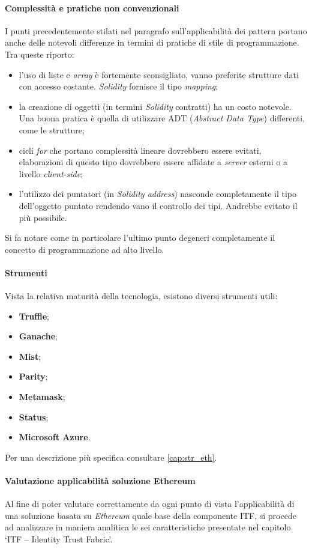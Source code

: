 \paragraph{Complessità e pratiche non convenzionali}
\label{cap:prestazioni}
I punti precedentemente stilati nel paragrafo sull’applicabilità dei pattern portano anche delle notevoli differenze in termini di pratiche di stile di programmazione. Tra queste riporto:
\begin{itemize}
    \item l’uso di liste e \emph{array} è fortemente sconsigliato, vanno preferite strutture dati con accesso costante. \emph{Solidity} fornisce il tipo \emph{mapping};
    \item la creazione di oggetti (in termini \emph{Solidity} contratti) ha un costo notevole. Una buona pratica è quella di utilizzare ADT (\emph{Abstract Data Type}) differenti, come le strutture;
    \item cicli \emph{for} che portano complessità lineare dovrebbero essere evitati, elaborazioni di questo tipo dovrebbero essere affidate a \emph{server} esterni o a livello \emph{client-side};
    \item l’utilizzo dei puntatori (in \emph{Solidity address}) nasconde completamente il tipo dell’oggetto puntato rendendo vano il controllo dei tipi. Andrebbe evitato il più possibile.
\end{itemize}
Si fa notare come in particolare l’ultimo punto degeneri completamente il concetto di programmazione ad alto livello.

\paragraph{Strumenti}
Vista la relativa maturità della tecnologia, esistono diversi strumenti utili:
\begin{itemize}
    \item \textbf{Truffle};
    \item \textbf{Ganache};
    \item \textbf{Mist};
    \item \textbf{Parity};
    \item \textbf{Metamask};
    \item \textbf{Status};
    \item \textbf{Microsoft Azure}.
\end{itemize}
Per una descrizione più specifica consultare \ref{cap:str_eth}.

\paragraph{Valutazione applicabilità soluzione Ethereum}
Al fine di poter valutare correttamente da ogni punto di vista l’applicabilità di una soluzione basata su \emph{Ethereum} quale base della componente ITF, si procede ad analizzare in maniera analitica le sei caratteristiche presentate nel capitolo ‘ITF – Identity Trust Fabric’.

